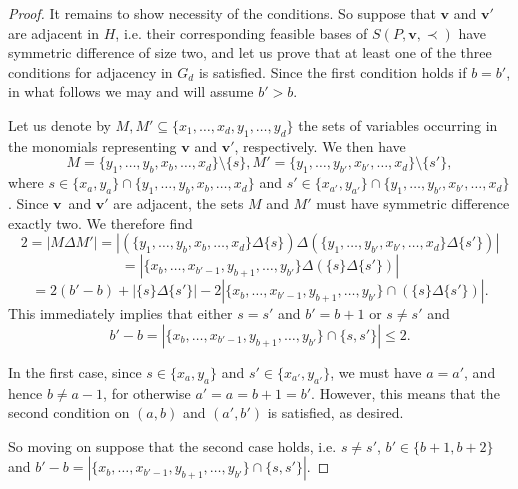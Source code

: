 \documentclass[centering,11pt,reqno]{amsart}
\theoremstyle{definition}
\begin{document}
\begin{proof}
It remains to show necessity of the conditions. So suppose that $\mathbf{v}$ and $\mathbf{v}'$ are adjacent in $H$, i.e. their corresponding feasible bases of $S(P,\mathbf{v},\prec)$ have symmetric difference of size two, and let us prove that at least one of the three conditions for adjacency in $G_d$ is satisfied. Since the first condition holds if $b=b'$, in what follows we may and will assume $b'>b$. 

Let us denote by $M, M'\subseteq \{x_1,\ldots,x_d,y_1,\ldots,y_d\}$ the sets of variables occurring in the monomials representing $\mathbf{v}$ and $\mathbf{v}'$, respectively. We then have $$M=\{y_1,\ldots,y_b,x_b,\ldots,x_d\}\setminus \{s\}, M'=\{y_1,\ldots,y_{b'},x_{b'},\ldots,x_d\}\setminus \{s'\},$$ where $s\in \{x_a,y_a\}\cap \{y_1,\ldots,y_b,x_b,\ldots,x_d\}$ and $s'\in \{x_{a'},y_{a'}\}\cap \{y_1,\ldots,y_{b'},x_{b'},\ldots,x_d\}$. Since $\mathbf{v}$~and $\mathbf{v}'$ are adjacent, the sets $M$ and $M'$ must have symmetric difference exactly two. We therefore find
$$2=|M\Delta M'|=|(\{y_1,\ldots,y_b,x_b,\ldots,x_d\}\Delta \{s\})\Delta (\{y_1,\ldots,y_{b'},x_{b'},\ldots,x_d\}\Delta \{s'\})|$$
$$=|\{x_b,\ldots,x_{b'-1},y_{b+1},\ldots,y_{b'}\}\Delta (\{s\}\Delta \{s'\})|$$ $$=2(b'-b)+|\{s\}\Delta\{s'\}|-2|\{x_b,\ldots,x_{b'-1},y_{b+1},\ldots,y_{b'}\}\cap(\{s\}\Delta\{s'\})|.$$
This immediately implies that either $s=s'$ and $b'=b+1$ or $s\neq s'$ and $$b'-b=|\{x_b,\ldots,x_{b'-1},y_{b+1},\ldots,y_{b'}\}\cap \{s,s'\}|\le 2.$$  

In the first case, since $s\in \{x_a,y_a\}$ and $s'\in \{x_{a'},y_{a'}\}$, we must have $a=a'$, and hence $b\neq a-1$, for otherwise $a'=a=b+1=b'$. However, this means that the second condition on $(a,b)$ and $(a',b')$ is satisfied, as desired.

So moving on suppose that the second case holds, i.e. $s\neq s'$, $b'\in \{b+1,b+2\}$ and $b'-b=|\{x_b,\ldots,x_{b'-1},y_{b+1},\ldots,y_{b'}\}\cap \{s,s'\}|$.  



\end{proof}
\end{document}
